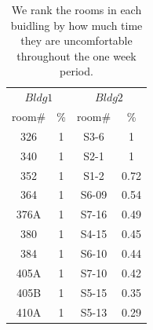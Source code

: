 \begin{table}[ht!]
 \begin{center}
	\begin{tabular}{|c|c|c|c|}
	\multicolumn{2}{c}{$Bldg 1$}
	 & \multicolumn{2}{c}{$Bldg 2$}\\
	\cline{1-4} 
	 room\# & \% & room\# & \%\\
	\cline{1-4}
	 326 & 1 & S3-6 & 1\\
	\cline{1-4}
	 340 & 1 & S2-1 & 1\\
	\cline{1-4}
	352 & 1 & S1-2 & 0.72\\
	\cline{1-4}
	364 & 1 & S6-09 & 0.54\\
	\cline{1-4}
	376A & 1 & S7-16 & 0.49\\
	\cline{1-4}
	380 & 1 & S4-15 & 0.45\\
	\cline{1-4}
	384 & 1 & S6-10 & 0.44\\
	\cline{1-4}
	405A & 1 & S7-10 & 0.42\\
	\cline{1-4}
	405B & 1 & S5-15 & 0.35\\
	\cline{1-4}
	410A & 1 & S5-13 & 0.29\\
	\cline{1-4}
	\end{tabular}
 \end{center}
 \caption{We rank the rooms in each buidling by how much time they are uncomfortable throughout the one week period.}
 \label{tab:cluster}
\end{table}

